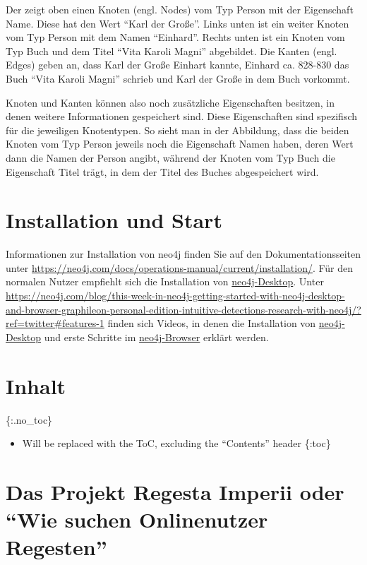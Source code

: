 \documentclass[ngerman,]{scrreprt}
\providecommand{\tightlist}{%
  \setlength{\itemsep}{0pt}\setlength{\parskip}{0pt}}
\begin{document}
Der zeigt oben einen Knoten (engl. Nodes) vom Typ Person mit der Eigenschaft Name. Diese hat den Wert ``Karl der Große''. Links unten ist ein weiter Knoten vom Typ Person mit dem Namen ``Einhard''. Rechts unten ist ein Knoten vom Typ Buch und dem Titel ``Vita Karoli Magni'' abgebildet. Die Kanten (engl. Edges) geben an, dass Karl der Große Einhart kannte, Einhard ca. 828-830 das Buch ``Vita Karoli Magni'' schrieb und Karl der Große in dem Buch vorkommt.

Knoten und Kanten können also noch zusätzliche Eigenschaften besitzen, in denen weitere Informationen gespeichert sind. Diese Eigenschaften sind spezifisch für die jeweiligen Knotentypen. So sieht man in der Abbildung, dass die beiden Knoten vom Typ Person jeweils noch die Eigenschaft Namen haben, deren Wert dann die Namen der Person angibt, während der Knoten vom Typ Buch die Eigenschaft Titel trägt, in dem der Titel des Buches abgespeichert wird.

\chapter{Installation und Start}\label{installation-und-start}

Informationen zur Installation von neo4j finden Sie auf den Dokumentationsseiten unter \url{https://neo4j.com/docs/operations-manual/current/installation/}. Für den normalen Nutzer empfiehlt sich die Installation von \href{https://neo4j.com/download/}{neo4j-Desktop}. Unter \url{https://neo4j.com/blog/this-week-in-neo4j-getting-started-with-neo4j-desktop-and-browser-graphileon-personal-edition-intuitive-detections-research-with-neo4j/?ref=twitter\#features-1} finden sich Videos, in denen die Installation von \href{https://www.youtube.com/watch?v=8yWhuUnPapw}{neo4j-Desktop} und erste Schritte im \href{https://www.youtube.com/watch?v=rQTximyaETA}{neo4j-Browser} erklärt werden.

\chapter{Inhalt}\label{inhalt-1}

\{:.no\_toc\}

\begin{itemize}
\tightlist
\item
  Will be replaced with the ToC, excluding the ``Contents'' header \{:toc\}
\end{itemize}

\chapter{\texorpdfstring{Das Projekt Regesta Imperii oder ``Wie suchen Onlinenutzer Regesten''}{Das Projekt Regesta Imperii oder Wie suchen Onlinenutzer Regesten}}\label{das-projekt-regesta-imperii-oder-wie-suchen-onlinenutzer-regesten}
\end{document}

